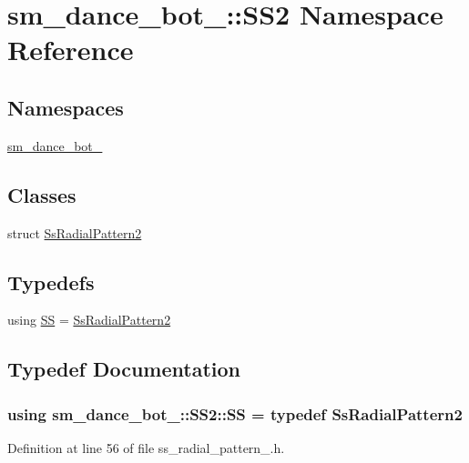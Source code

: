 \hypertarget{namespacesm__dance__bot__3_1_1SS2}{}\section{sm\+\_\+dance\+\_\+bot\+\_\+:\+:S\+S2 Namespace Reference}
\label{namespacesm__dance__bot__3_1_1SS2}
\subsection*{Namespaces}
\begin{DoxyCompactItemize}
\item 
 \hyperlink{namespacesm__dance__bot__3_1_1SS2_1_1sm__dance__bot__3}{sm\+\_\+dance\+\_\+bot\+\_}
\end{DoxyCompactItemize}
\subsection*{Classes}
\begin{DoxyCompactItemize}
\item 
struct \hyperlink{structsm__dance__bot__3_1_1SS2_1_1SsRadialPattern2}{Ss\+Radial\+Pattern2}
\end{DoxyCompactItemize}
\subsection*{Typedefs}
\begin{DoxyCompactItemize}
\item 
using \hyperlink{namespacesm__dance__bot__3_1_1SS2_ae79ad46f5855381231ed20957cbfedfb}{SS} = \hyperlink{structsm__dance__bot__3_1_1SS2_1_1SsRadialPattern2}{Ss\+Radial\+Pattern2}
\end{DoxyCompactItemize}


\subsection{Typedef Documentation}
\subsubsection[{\texorpdfstring{SS}{SS}}]{\setlength{\rightskip}{0pt plus 5cm}using {\bf sm\+\_\+dance\+\_\+bot\+\_\+::\+S\+S2\+::\+SS} = typedef {\bf Ss\+Radial\+Pattern2}}\hypertarget{namespacesm__dance__bot__3_1_1SS2_ae79ad46f5855381231ed20957cbfedfb}{}\label{namespacesm__dance__bot__3_1_1SS2_ae79ad46f5855381231ed20957cbfedfb}


Definition at line 56 of file ss\+\_\+radial\+\_\+pattern\+\_.\+h.

